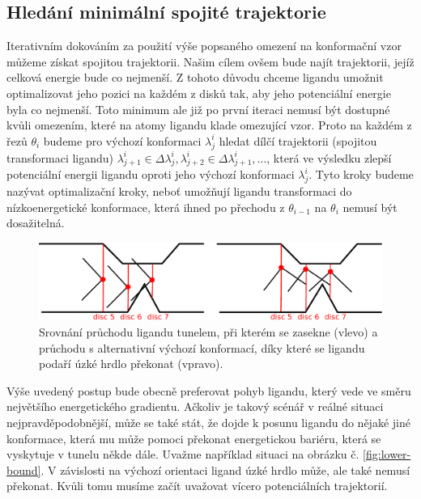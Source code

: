 \subsection{Hledání minimální spojité trajektorie}
Iterativním dokováním za použití výše popsaného omezení na konformační vzor můžeme
získat spojitou trajektorii. Našim cílem ovšem bude najít trajektorii, jejíž
celková energie bude co nejmenší. Z tohoto důvodu chceme ligandu
umožnit optimalizovat jeho pozici na každém z disků tak, aby jeho potenciální
energie byla co nejmenší. Toto minimum ale již po první iteraci nemusí být dostupné
kvůli omezením, které na atomy ligandu klade omezující vzor. Proto na každém
z řezů $ \theta_i $ budeme pro výchozí konformaci $ \lambda^i_j $ hledat dílčí
trajektorii (spojitou transformaci ligandu) $ \lambda^i_{j+1} \in \Delta \lambda^i_j,
\lambda^i_{j+2} \in \Delta \lambda^i_{j+1}, \dots $, která ve výsledku
zlepší potenciální energii ligandu oproti jeho výchozí konformaci $ \lambda^i_j $.
Tyto kroky budeme nazývat optimalizační kroky, neboť umožňují ligandu transformaci
do nízkoenergetické konformace, která ihned po přechodu z $ \theta_{i - 1} $
na $ \theta_i $ nemusí být dosažitelná.

\begin{figure}[t]
\centering
\includegraphics[width=.8\hsize]{img/tun-3.pdf}
\caption{Srovnání průchodu ligandu tunelem, při kterém se zasekne (vlevo) a
průchodu s alternativní výchozí konformací, díky které se ligandu podaří
úzké hrdlo překonat (vpravo).
}
\label{fig:backtracking}
\end{figure}

Výše uvedený postup bude obecně preferovat pohyb ligandu, který vede ve směru
největšího energetického gradientu. Ačkoliv je takový scénář v reálné situaci
nejpravděpodobnější, může se také stát, že dojde k posunu ligandu do nějaké
jiné konformace, která mu může pomoci překonat energetickou bariéru, která se
vyskytuje v tunelu někde dále. Uvažme například situaci na obrázku
č. \ref{fig:lower-bound}. V závislosti na výchozí orientaci ligand úzké hrdlo
může, ale také nemusí překonat. Kvůli tomu musíme začít uvažovat vícero potenciálních
trajektorií.

